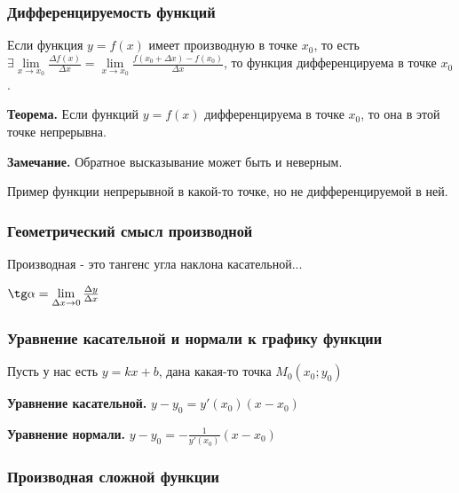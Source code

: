 \documentclass{article}
\begin{document}
\begin{flushleft}
\subsubsection{Дифференцируемость функций}

Если функция $y = f(x)$ имеет производную в точке $x_0$, то есть $\exists \lim\limits_{x \to x_0} \frac{\Delta f(x)}{\Delta x} = \lim\limits_{x \to x_0} \frac{f(x_0 + \Delta x) - f(x_0)}{\Delta x}$, то функция дифференцируема в точке $x_0$.

\hfill

\textbf{Теорема.} Если функций $y = f(x)$ дифференцируема в точке $x_0$, то она в этой точке непрерывна.

\textbf{Замечание.} Обратное высказывание может быть и неверным.

\hfill

Пример функции непрерывной в какой-то точке, но не дифференцируемой в ней.


\subsubsection{Геометрический смысл производной}

Производная - это тангенс угла наклона касательной...

$\tg \alpha = \lim\limits_{\Delta x \to 0} \frac{\Delta y}{\Delta x}$

\subsubsection{Уравнение касательной и нормали к графику функции}

Пусть у нас есть $y = kx + b$, дана какая-то точка $M_0(x_0; y_0)$

\hfill

\textbf{Уравнение касательной.} $y - y_0 = y'(x_0)(x - x_0)$

\hfill

\textbf{Уравнение нормали.} $y - y_0 = -\frac{1}{y'(x_0)} (x - x_0)$

\subsubsection{Производная сложной функции}


\end{flushleft}
\end{document}
